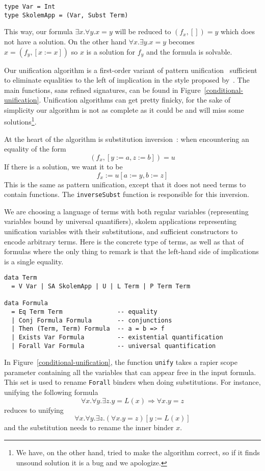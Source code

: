 \documentclass[sigconf]{acmart}
\newcommand{\tc}[1]{{\small\texttt{#1}}}
\begin{document}
\begin{verbatim}
type Var = Int
type SkolemApp = (Var, Subst Term)
\end{verbatim}

This way, our formula $\exists x. \forall y. x=y$ will be reduced to
$(f_{x},[]) = y$ which does not have a solution. On the other hand
$\forall x. \exists y. x = y$ becomes $x = (f_{y}, [x:=x])$ so $x$ is a solution
for $f_{y}$ and the formula is solvable.

Our unification algorithm is a first-order variant of pattern
unification~\cite{miller91-pattern} sufficient to eliminate equalities to the
left of implication in the style proposed by~\citet{miller22}. The main
functions, sans refined signatures, can be found in
Figure~\ref{conditional-unification}. Unification algorithms can get pretty
finicky, for the sake of simplicity our algorithm is not as complete as it could
be and will miss some solutions\footnote{We have, on the other hand, tried to
  make the algorithm correct, so if it finds unsound solution it is a bug and we
  apologize.}.

At the heart of the algorithm is substitution inversion~\cite{ziliani15}: when
encountering an equality of the form
$$(f_{x},[y:=a, z:=b]) = u$$
If there is a solution, we want it to be
$$f_{x} := u[a:=y, b:=z]$$
This is the same as pattern unification, except that it does not need terms to
contain functions. The \tc{inverseSubst} function is responsible for this
inversion.

We are choosing a language of terms with both regular variables (representing
variables bound by universal quantifiers), skolem applications representing
unification variables with their substitutions, and sufficient
constructors to encode arbitrary terms. Here is the concrete type of terms, as
well as that of formulas where the only thing to remark is that the left-hand
side of implications is a single equality.

\begin{verbatim}
data Term
  = V Var | SA SkolemApp | U | L Term | P Term Term

data Formula
  = Eq Term Term               -- equality
  | Conj Formula Formula       -- conjunctions
  | Then (Term, Term) Formula  -- a = b => f
  | Exists Var Formula         -- existential quantification
  | Forall Var Formula         -- universal quantification
\end{verbatim}

In Figure~\ref{conditional-unification}, the function \tc{unify} takes a rapier scope parameter containing all the variables that
can appear free in the input formula. This set is used to rename \tc{Forall}
binders when doing substitutions. For instance, unifying the following formula
$$\forall x. \forall y. \exists z. y = L(x) \Rightarrow \forall x. y = z$$
reduces to unifying
$$\forall x. \forall y. \exists z. (\forall x. y = z)[y:=L(x)]$$
and the substitution needs to rename the inner binder $x$.
\end{document}
